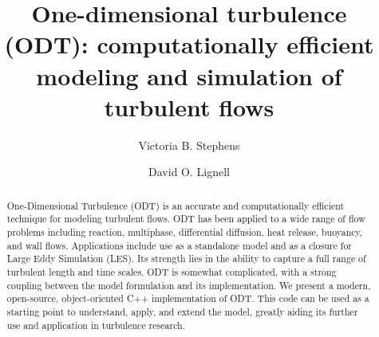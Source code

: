 \documentclass[preprint,12pt, a4paper]{elsarticle}
\begin{document}
\begin{frontmatter}



\title{One-dimensional turbulence (ODT): computationally efficient modeling and simulation of turbulent  flows}


\author{Victoria B. Stephens}
\author{David O. Lignell}


\address{Chemical Engineering Department, Brigham Young University, Provo, UT 84602, USA}

\begin{abstract}
%
One-Dimensional Turbulence (ODT) is an accurate and computationally efficient technique for modeling turbulent flows. ODT has been applied to a wide range of flow problems including reaction, multiphase, differential diffusion, heat release, buoyancy, and wall flows. Applications include use as a standalone model and as a closure for Large Eddy Simulation (LES). Its strength lies in the ability to capture a full range of turbulent length and time scales. ODT is somewhat complicated, with a strong coupling between the model formulation and its implementation. We present a modern, open-source, object-oriented C++ implementation of ODT. This code can be used as a starting point to understand, apply, and extend the model, greatly aiding its further use and application in turbulence research.
%
\end{abstract}


\end{frontmatter}
\end{document}
